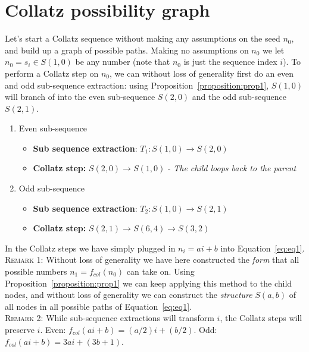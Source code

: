 \documentclass{article}
\theoremstyle{definition}
\begin{document}
\section{Collatz possibility graph}
Let's start a Collatz sequence without making any assumptions on the seed $n_0$, and build up a graph of possible paths. Making no assumptions on $n_0$ we let $n_0=s_i\in S(1,0)$ be any number (note that $n_0$ is just the sequence index $i$). To perform a Collatz step on $n_0$, we can without loss of generality first do an even and odd sub-sequence extraction: using Proposition~\ref{proposition:prop1}, $S(1,0)$ will branch of into the even sub-sequence $S(2,0)$ and the odd sub-sequence $S(2,1)$.
\begin{enumerate}
    \item
    Even sub-sequence
    \begin{itemize}
        \item
        \textbf{Sub sequence extraction}: $T_1: S(1,0) \longrightarrow S(2,0)$
        \item \textbf{Collatz step:} $S(2,0) \longrightarrow S(1,0)$ - \textit{The child loops back to the parent}
    \end{itemize}
    \item
    Odd sub-sequence
    \begin{itemize}
        \item
        \textbf{Sub sequence extraction}: $T_2: S(1,0) \longrightarrow S(2,1)$
        \item \textbf{Collatz step:} $S(2,1) \longrightarrow S(6,4) \longrightarrow S(3,2)$
    \end{itemize}
\end{enumerate}
%
In the Collatz steps we have simply plugged in $n_i=ai+b$ into Equation~\ref{eq:eq1}.
%
\\[.4cm]
%
\textsc{Remark 1:} Without loss of generality we have here constructed the \textit{form} that all possible numbers $n_1 = f_{col}(n_0)$ can take on. Using Proposition~\ref{proposition:prop1} we can keep applying this method to the child nodes, and without loss of generality we can construct the \textit{structure} $S(a,b)$ of all nodes in all possible paths of Equation~\ref{eq:eq1}.
%
\\[.4cm]
%
\textsc{Remark 2:} While sub-sequence extractions will transform $i$, the Collatz steps will preserve $i$. Even: $f_{col}(ai+b) = (a/2)i+(b/2)$. Odd: $f_{col}(ai+b)=3ai + (3b+1)$.
\end{document}
